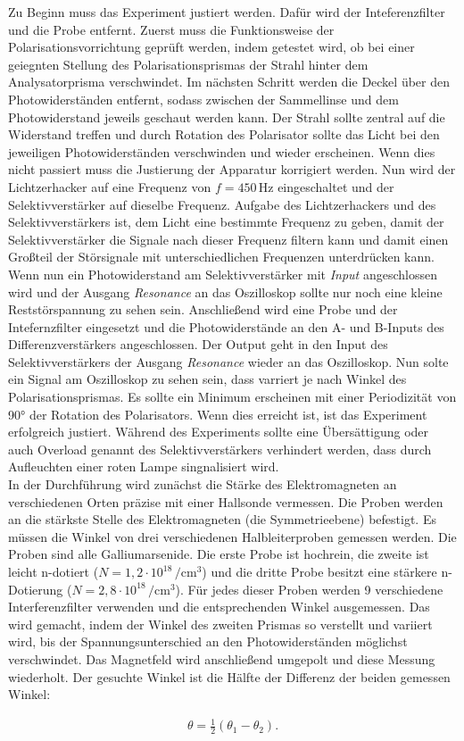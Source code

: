 Zu Beginn muss das Experiment justiert werden. Dafür wird der Inteferenzfilter und die Probe entfernt. Zuerst muss die Funktionsweise der Polarisationsvorrichtung geprüft werden, indem getestet wird, ob bei einer geiegnten Stellung des Polarisationsprismas der Strahl hinter dem Analysatorprisma verschwindet. Im nächsten Schritt werden die Deckel über den Photowiderständen entfernt, sodass zwischen der Sammellinse und dem Photowiderstand jeweils geschaut werden kann. Der Strahl sollte zentral auf die Widerstand treffen und durch Rotation des Polarisator sollte das Licht bei den jeweiligen Photowiderständen verschwinden und wieder erscheinen. Wenn dies nicht passiert muss die Justierung der Apparatur korrigiert werden. Nun wird der Lichtzerhacker auf eine Frequenz von $f = 450 \, \mathrm{Hz}$ eingeschaltet und der Selektivverstärker auf dieselbe Frequenz. Aufgabe des Lichtzerhackers und des Selektivverstärkers ist, dem Licht eine bestimmte Frequenz zu geben, damit der Selektivverstärker die Signale nach dieser Frequenz filtern kann und damit einen Großteil der Störsignale mit unterschiedlichen Frequenzen unterdrücken kann. Wenn nun ein Photowiderstand am Selektivverstärker mit \textit{Input} angeschlossen wird und der Ausgang \textit{Resonance} an das Oszilloskop sollte nur noch eine kleine Reststörspannung zu sehen sein. Anschließend wird eine Probe und der Intefernzfilter eingesetzt und die Photowiderstände an den A- und B-Inputs des Differenzverstärkers angeschlossen. Der Output geht in den Input des Selektivverstärkers der Ausgang \textit{Resonance} wieder an das Oszilloskop. Nun solte ein Signal am Oszilloskop zu sehen sein, dass varriert je nach Winkel des Polarisationsprismas. Es sollte ein Minimum erscheinen mit einer Periodizität von 90° der Rotation des Polarisators. Wenn dies erreicht ist, ist das Experiment erfolgreich justiert. Während des Experiments sollte eine Übersättigung oder auch Overload genannt des Selektivverstärkers verhindert werden, dass durch Aufleuchten einer roten Lampe singnalisiert wird. \\

In der Durchführung wird zunächst die Stärke des Elektromagneten an verschiedenen Orten präzise mit einer Hallsonde vermessen. Die Proben werden an die stärkste Stelle des Elektromagneten (die Symmetrieebene) befestigt. 
Es müssen die Winkel von drei verschiedenen Halbleiterproben gemessen werden. Die Proben sind alle Galliumarsenide. Die erste Probe ist hochrein, die zweite ist leicht n-dotiert ($N = 1,2 \cdot 10^{18}\,\si{\per\centi\metre\cubed}$) 
und die dritte Probe besitzt eine stärkere n-Dotierung ($N = 2,8 \cdot 10^{18} \,\si{\per\centi\metre\cubed}$). Für jedes dieser Proben werden 9 verschiedene Interferenzfilter verwenden und die entsprechenden Winkel ausgemessen. 
Das wird gemacht, indem der Winkel des zweiten Prismas so verstellt und variiert wird, bis der Spannungsunterschied an den Photowiderständen möglichst verschwindet. Das Magnetfeld wird anschließend umgepolt und diese Messung wiederholt. 
Der gesuchte Winkel ist die Hälfte der Differenz der beiden gemessen Winkel:

\begin{align*}
    \theta = \frac{1}{2} (\theta_1 - \theta_2).
\end{align*}
